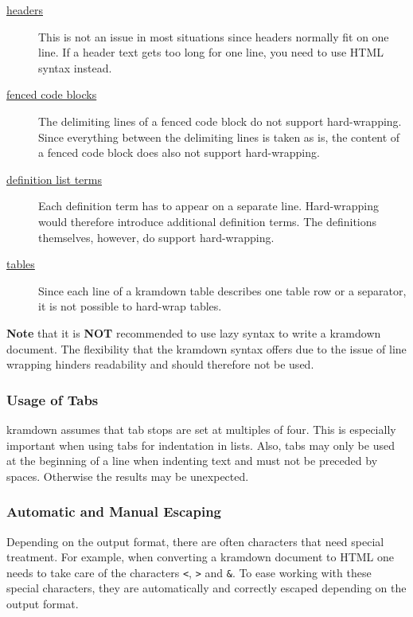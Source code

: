 \documentclass[a4paper]{article}
\begin{document}
\begin{description}
\item[{\protect\hyperlink{headers}{headers}}]
This is not an issue in most situations since headers normally fit on
one line. If a header text gets too long for one line, you need to use
HTML syntax instead.
\item[{\protect\hyperlink{fenced-code-blocks}{fenced code blocks}}]
The delimiting lines of a fenced code block do not support
hard-wrapping. Since everything between the delimiting lines is taken as
is, the content of a fenced code block does also not support
hard-wrapping.
\item[{\protect\hyperlink{definition-lists}{definition list terms}}]
Each definition term has to appear on a separate line. Hard-wrapping
would therefore introduce additional definition terms. The definitions
themselves, however, do support hard-wrapping.
\item[{\protect\hyperlink{tables}{tables}}]
Since each line of a kramdown table describes one table row or a
separator, it is not possible to hard-wrap tables.
\end{description}

\textbf{Note} that it is \textbf{NOT} recommended to use lazy syntax to
write a kramdown document. The flexibility that the kramdown syntax
offers due to the issue of line wrapping hinders readability and should
therefore not be used.

\hypertarget{usage-of-tabs}{\subsubsection{Usage of
Tabs}\label{usage-of-tabs}}

kramdown assumes that tab stops are set at multiples of four. This is
especially important when using tabs for indentation in lists. Also,
tabs may only be used at the beginning of a line when indenting text and
must not be preceded by spaces. Otherwise the results may be unexpected.

\hypertarget{automatic-and-manual-escaping}{\subsubsection{Automatic and
Manual Escaping}\label{automatic-and-manual-escaping}}

Depending on the output format, there are often characters that need
special treatment. For example, when converting a kramdown document to
HTML one needs to take care of the characters \texttt{\textless{}},
\texttt{\textgreater{}} and \texttt{\&}. To ease working with these
special characters, they are automatically and correctly escaped
depending on the output format.
\end{document}
